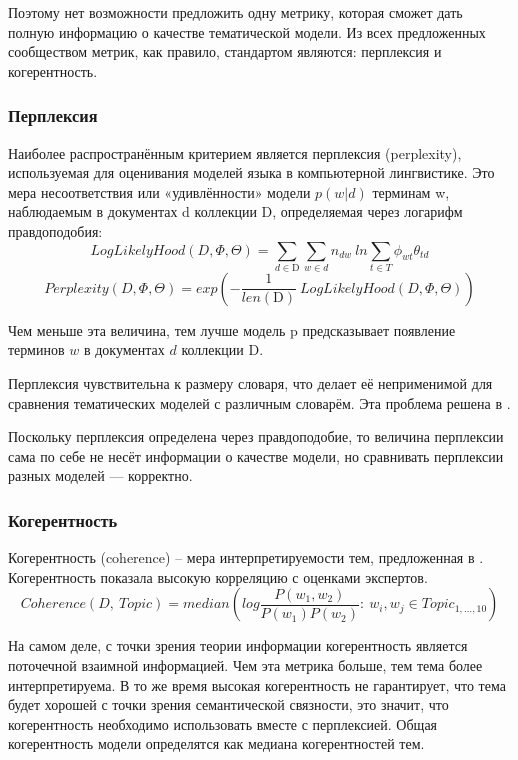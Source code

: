 \documentclass[a4paper, 14pt]{extarticle}
\begin{document}
	Поэтому нет возможности предложить одну метрику, которая сможет дать полную информацию о качестве тематической модели. Из всех предложенных сообществом метрик, как правило, стандартом являются: перплексия и когерентность. 
	
 	\subsubsection*{Перплексия}
 	Наиболее распространённым критерием является перплексия (perplexity), используемая для оценивания моделей языка в компьютерной лингвистике. Это мера несоответствия или «удивлённости» модели $p(w | d)$ терминам w, наблюдаемым в документах d коллекции D, определяемая через логарифм правдоподобия:
	\begin{equation}
	 	LogLikelyHood(D, \Phi, \Theta) = \sum_{d \in \mathrm{D}} \sum_{w \in d} n_{dw}~ln \sum_{t \in T} \phi_{wt} \theta_{td}
		\label{llh}
	\end{equation}
 	\begin{equation}
	 	Perplexity(D, \Phi, \Theta) = exp\left( -\frac{1}{len(\textrm{D})}~LogLikelyHood(D, \Phi, \Theta) \right)
	 	\label{perp}
	\end{equation}
 	
 	Чем меньше эта величина, тем лучше модель p предсказывает появление терминов $w$ в документах $d$ коллекции $\textrm{D}$. 
 	
 	Перплексия чувствительна к размеру словаря, что делает её неприменимой для сравнения тематических моделей с различным словарём. Эта проблема решена в \cite{Nyzhybytskyy}. 
 	
 	Поскольку перплексия определена через правдоподобие, то величина перплексии сама по себе не несёт информации о качестве модели, но сравнивать перплексии разных моделей --- корректно.
 	\subsubsection*{Когерентность}
 	Когерентность (coherence) -- мера интерпретируемости тем, предложенная в \cite{Newman09}. Когерентность показала высокую корреляцию с оценками экспертов. 
 	\begin{equation}
	 	Coherence(D,~Topic) = median\left(log\frac{P(w_1, w_2)}{P(w_1) P(w_2)}:~w_i, w_j\in Topic_{1, \dots, 10}\right)
 		\label{ch}
 	\end{equation}

 	На самом деле, с точки зрения теории информации когерентность является поточечной взаимной информацией. Чем эта метрика больше, тем тема более интерпретируема. В то же время высокая когерентность не гарантирует, что тема будет хорошей с точки зрения семантической связности, это значит, что когерентность необходимо использовать вместе с перплексией. Общая когерентность модели определятся как медиана когерентностей тем.
 	
\end{document}
